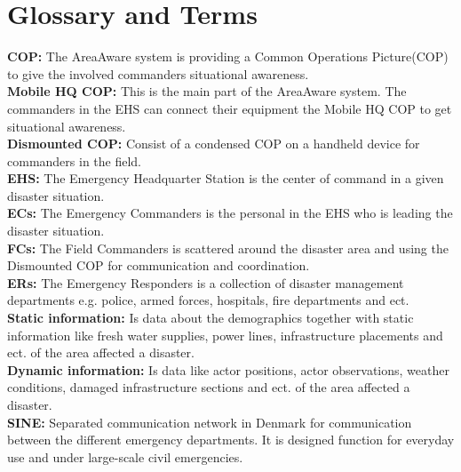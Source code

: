 \appendix
\label{chp_appendix}
\chapter{Glossary and Terms}

\textbf{COP:} The AreaAware system is providing a Common Operations Picture(COP) to give the involved commanders situational awareness.\\

\noindent \textbf{Mobile HQ COP:} This is the main part of the AreaAware system. The commanders in the EHS can connect their equipment the Mobile HQ COP to get situational awareness.\\

\noindent \textbf{Dismounted COP:} Consist of a condensed COP on a handheld device for commanders in the field.\\

\noindent \textbf{EHS:} The Emergency Headquarter Station is the center of command in a given disaster situation.\\

\noindent \textbf{ECs:} The Emergency Commanders is the personal in the EHS who is leading the disaster situation.\\

\noindent \textbf{FCs:} The Field Commanders is scattered around the disaster area and using the Dismounted COP for communication and coordination.\\

\noindent \textbf{ERs:} The Emergency Responders is a collection of disaster management departments e.g. police, armed forces, hospitals, fire departments and ect.\\

\noindent \textbf{Static information:} Is data about the demographics together with static information like fresh water supplies, power lines, infrastructure placements and ect. of the area affected a disaster.\\

\noindent \textbf{Dynamic information:} Is data like actor positions, actor observations, weather conditions, damaged infrastructure sections and ect. of the area affected a disaster.\\

\noindent \textbf{SINE:} Separated communication network in Denmark for communication between the different emergency departments. It is designed function for everyday use and under large-scale civil emergencies.\\